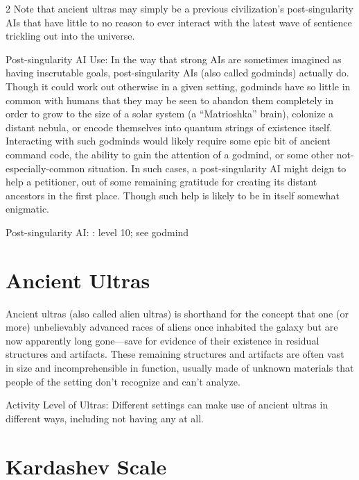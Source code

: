 \begin{multicols}{2}
Note that ancient ultras may simply be a previous civilization’s post-singularity AIs that have little to no reason to ever interact with the latest wave of sentience trickling out into the universe.

Post-singularity AI Use: In the way that strong AIs are sometimes imagined as having inscrutable goals, post-singularity AIs (also called godminds) actually do. Though it could work out otherwise in a given setting, godminds have so little in common with humans that they may be seen to abandon them completely in order to grow to the size of a solar system (a “Matrioshka” brain), colonize a distant nebula, or encode themselves into quantum strings of existence itself. Interacting with such godminds would likely require some epic bit of ancient command code, the ability to gain the attention of a godmind, or some other not-especially-common situation. In such cases, a post-singularity AI might deign to help a petitioner, out of some remaining gratitude for creating its distant ancestors in the first place. Though such help is likely to be in itself somewhat enigmatic.
	
Post-singularity AI: : level 10; see godmind

\chapter{Ancient Ultras}

Ancient ultras (also called alien ultras) is shorthand for the concept that one (or more) unbelievably advanced races of aliens once inhabited the galaxy but are now apparently long gone—save for evidence of their existence in residual structures and artifacts. These remaining structures and artifacts are often vast in size and incomprehensible in function, usually made of unknown materials that people of the setting don’t recognize and can’t analyze. 

Activity Level of Ultras: Different settings can make use of ancient ultras in different ways, including not having any at all.

\chapter{Kardashev Scale}


\end{multicols}
